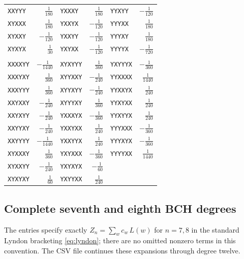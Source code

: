 \begin{longtable}{@{}lrlrlr@{}}
\texttt{XXYYY} & $\tfrac{1}{180}$ & \texttt{YXXXY} & $\tfrac{1}{180}$ & \texttt{YYXYY} & $-\tfrac{1}{120}$ \\
\texttt{XYXXX} & $\tfrac{1}{180}$ & \texttt{YXXYX} & $-\tfrac{1}{120}$ & \texttt{YYYXX} & $\tfrac{1}{180}$ \\
\texttt{XYXXY} & $-\tfrac{1}{120}$ & \texttt{YXXYY} & $-\tfrac{1}{120}$ & \texttt{YYYXY} & $\tfrac{1}{180}$ \\
\texttt{XYXYX} & $\tfrac{1}{30}$ & \texttt{YXYXX} & $-\tfrac{1}{120}$ & \texttt{YYYYX} & $-\tfrac{1}{720}$ \\
\addlinespace[3pt]
\multicolumn{6}{@{}l}{\textit{Degree 6}}\\[2pt]
\texttt{XXXXYY} & $-\tfrac{1}{1440}$ & \texttt{XYXYYY} & $\tfrac{1}{360}$ & \texttt{YXYYYX} & $-\tfrac{1}{360}$ \\
\texttt{XXXYXY} & $\tfrac{1}{360}$ & \texttt{XYYXXY} & $-\tfrac{1}{240}$ & \texttt{YYXXXX} & $\tfrac{1}{1440}$ \\
\texttt{XXXYYY} & $\tfrac{1}{360}$ & \texttt{XYYXYY} & $-\tfrac{1}{240}$ & \texttt{YYXXYX} & $\tfrac{1}{240}$ \\
\texttt{XXYXXY} & $-\tfrac{1}{240}$ & \texttt{XYYYXY} & $\tfrac{1}{360}$ & \texttt{YYXYXX} & $\tfrac{1}{240}$ \\
\texttt{XXYXYY} & $-\tfrac{1}{240}$ & \texttt{YXXXYX} & $-\tfrac{1}{360}$ & \texttt{YYXYYX} & $\tfrac{1}{240}$ \\
\texttt{XXYYXY} & $-\tfrac{1}{240}$ & \texttt{YXXYXX} & $\tfrac{1}{240}$ & \texttt{YYYXXX} & $-\tfrac{1}{360}$ \\
\texttt{XXYYYY} & $-\tfrac{1}{1440}$ & \texttt{YXXYYX} & $\tfrac{1}{240}$ & \texttt{YYYXYX} & $-\tfrac{1}{360}$ \\
\texttt{XYXXXY} & $\tfrac{1}{360}$ & \texttt{YXYXXX} & $-\tfrac{1}{360}$ & \texttt{YYYYXX} & $\tfrac{1}{1440}$ \\
\texttt{XYXXYY} & $-\tfrac{1}{240}$ & \texttt{YXYXYX} & $-\tfrac{1}{60}$ &  &  \\
\texttt{XYXYXY} & $\tfrac{1}{60}$ & \texttt{YXYYXX} & $\tfrac{1}{240}$ &  &  \\
\end{longtable}\endgroup

\subsection{Complete seventh and eighth BCH degrees}
The entries specify exactly $Z_n=\sum_wc_w\,L(w)$ for $n=7,8$ in the standard
Lyndon bracketing \eqref{eq:lyndon}; there are no omitted nonzero terms in
this convention. The CSV file continues these expansions through degree
twelve.

